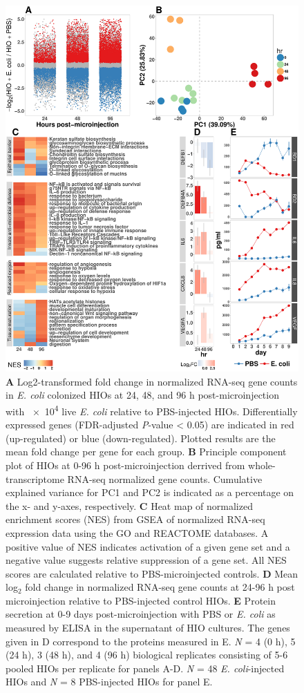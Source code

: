 \documentclass[9pt,lineo]{elife}
\begin{document}
\begin{figure}
\begin{fullwidth}
\centering
\includegraphics[width=0.80\linewidth]{./figures/figure2/figure2_multipanel.pdf}
\caption{\textbf{A} Log2-transformed fold change in normalized RNA-seq gene counts in \textit{E. coli} colonized HIOs at 24, 48, and 96 h post-microinjection with \num{e4} live \textit{E. coli} relative to PBS-injected HIOs. Differentially expressed genes (FDR-adjusted \textit{P}-value < 0.05) are indicated in red (up-regulated) or blue (down-regulated). Plotted results are the mean fold change per gene for each group. \textbf{B} Principle component plot of HIOs at 0-96 h post-microinjection derrived from whole-transcriptome RNA-seq normalized gene counts. Cumulative explained variance for PC1 and PC2 is indicated as a percentage on the x- and y-axes, respectively. \textbf{C} Heat map of normalized enrichment scores (NES) from GSEA of normalized RNA-seq expression data using the GO and REACTOME databases. A positive value of NES indicates activation of a given gene set and a negative value suggests relative suppression of a gene set. All NES scores are calculated relative to PBS-microinjected controls. \textbf{D} Mean log$_{2}$ fold change in normalized RNA-seq gene counts at 24-96 h post microinjection relative to PBS-injected control HIOs. \textbf{E} Protein secretion at 0-9 days post-microinjection with PBS or \textit{E. coli} as measured by ELISA in the supernatant of HIO cultures. The genes given in D correspond to the proteins measured in E. \textit{N} = 4 (0 h), 5 (24 h), 3 (48 h), and 4 (96 h) biological replicates consisting of 5-6 pooled HIOs per replicate for panels A-D. \textit{N} = 48 \textit{E. coli}-injected HIOs and \textit{N} = 8 PBS-injected HIOs for panel E.}
\label{fig:fullwidth}
\end{fullwidth}
\end{figure}
\end{document}
